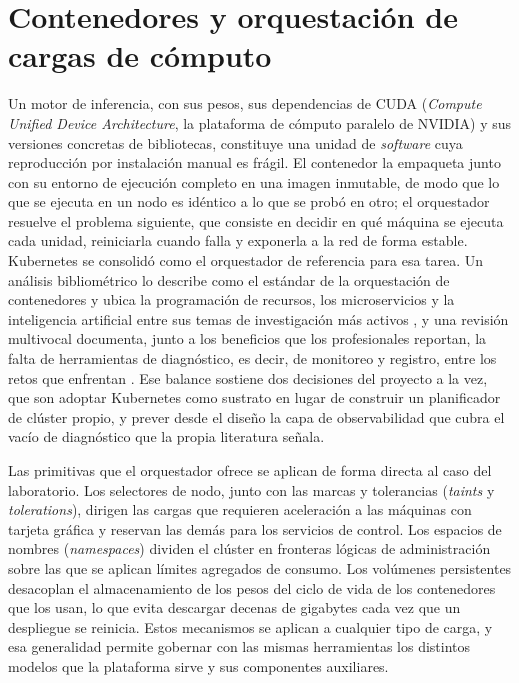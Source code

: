 \section{Contenedores y orquestación de cargas de cómputo}\label{sec:orquestacion-contenedores}

Un motor de inferencia, con sus pesos, sus dependencias de CUDA (\emph{Compute Unified Device Architecture}, la plataforma de cómputo paralelo de NVIDIA) y sus versiones concretas de bibliotecas, constituye una unidad de \emph{software} cuya reproducción por instalación manual es frágil. El contenedor la empaqueta junto con su entorno de ejecución completo en una imagen inmutable, de modo que lo que se ejecuta en un nodo es idéntico a lo que se probó en otro; el orquestador resuelve el problema siguiente, que consiste en decidir en qué máquina se ejecuta cada unidad, reiniciarla cuando falla y exponerla a la red de forma estable. Kubernetes se consolidó como el orquestador de referencia para esa tarea. Un análisis bibliométrico lo describe como el estándar de la orquestación de contenedores y ubica la programación de recursos, los microservicios y la inteligencia artificial entre sus temas de investigación más activos \citep{carrion-k8sbibliometric-2022}, y una revisión multivocal documenta, junto a los beneficios que los profesionales reportan, la falta de herramientas de diagnóstico, es decir, de monitoreo y registro, entre los retos que enfrentan \citep{shamim-k8smultivocal-2022}. Ese balance sostiene dos decisiones del proyecto a la vez, que son adoptar Kubernetes como sustrato en lugar de construir un planificador de clúster propio, y prever desde el diseño la capa de observabilidad que cubra el vacío de diagnóstico que la propia literatura señala.

Las primitivas que el orquestador ofrece se aplican de forma directa al caso del laboratorio. Los selectores de nodo, junto con las marcas y tolerancias (\emph{taints} y \emph{tolerations}), dirigen las cargas que requieren aceleración a las máquinas con tarjeta gráfica y reservan las demás para los servicios de control. Los espacios de nombres (\emph{namespaces}) dividen el clúster en fronteras lógicas de administración sobre las que se aplican límites agregados de consumo. Los volúmenes persistentes desacoplan el almacenamiento de los pesos del ciclo de vida de los contenedores que los usan, lo que evita descargar decenas de gigabytes cada vez que un despliegue se reinicia. Estos mecanismos se aplican a cualquier tipo de carga, y esa generalidad permite gobernar con las mismas herramientas los distintos modelos que la plataforma sirve y sus componentes auxiliares.

